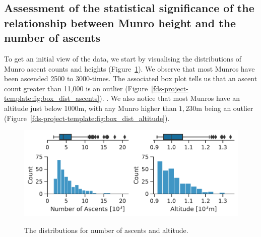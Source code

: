 \documentclass[11pt,a4paper]{article}
\begin{document}
\subsection{Assessment of the statistical significance of the relationship between Munro height and the number of ascents}
To get an initial view of the data, we start by visualising the distributions of Munro ascent counts and heights (Figure~\ref{fds-project-template:fig:box_dist}). We observe that most Munros have been ascended 2500 to 3000-times. The associated box plot tells us that an ascent count greater than 11,000 is an outlier (Figure~\ref{fds-project-template:fig:box_dist_ascents}). . We also notice that most Munros have an altitude just below 1000m, with any Munro higher than $1,230$m being an outlier (Figure~\ref{fds-project-template:fig:box_dist_altitude}).

\begin{figure} [h!]
  \centering
  \includegraphics{report/box_dist.pdf}
  
    \begin{minipage}[t]{.5\linewidth}
        \centering
        \label{fds-project-template:fig:box_dist_ascents}
    \end{minipage}%
    \begin{minipage}[t]{.5\linewidth}
        \centering
        \label{fds-project-template:fig:box_dist_altitude}
    \end{minipage}
  
  \caption{The distributions for number of ascents and altitude.}
  \label{fds-project-template:fig:box_dist}
\end{figure} \\
\end{document}
